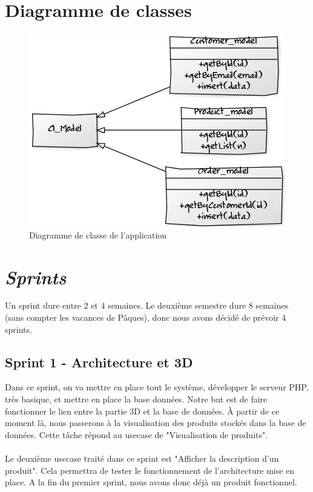 \documentclass[12pt]{article}
\begin{document}
\newpage
\section{Diagramme de classes}

\begin{figure}[ht]
    \center
    \includegraphics[scale=0.7]{../Diagrams/ClassDiagrams/Models.png}
    \caption*{Diagramme de classe de l'application}
\end{figure}

\newpage
\section{\textit{Sprints}}
Un sprint dure entre 2 et 4 semaines. Le deuxième semestre dure 8 semaines (sans compter les vacances de Pâques), donc nous avons décidé de prévoir 4 sprints.

\subsection{Sprint 1 - Architecture et 3D}
Dans ce sprint, on va mettre en place tout le système, développer le serveur PHP, très basique, et mettre en place la base données.
Notre but est de faire fonctionner le lien entre la partie 3D et la base de données.
À partir de ce moment là, nous passerons à la visualisation des produits stockés dans la base de données. Cette tâche répond au usecase de "Visualisation de produits".\\\\
Le deuxième usecase traité dans ce sprint est "Afficher la description d'un produit". Cela permettra de tester le fonctionnement de l'architecture mise en place.
A la fin du premier sprint, nous avons donc déjà un produit fonctionnel.
\end{document}
